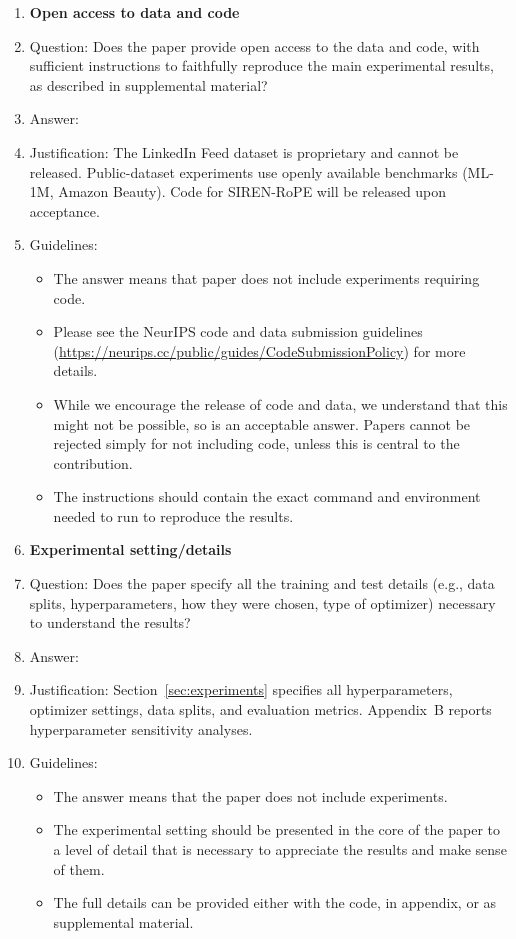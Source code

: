 \begin{enumerate}
\item {\bf Open access to data and code}
    \item[] Question: Does the paper provide open access to the data and code, with sufficient instructions to faithfully reproduce the main experimental results, as described in supplemental material?
    \item[] Answer: \answerNo{}
    \item[] Justification: The LinkedIn Feed dataset is proprietary and cannot be released. Public-dataset experiments use openly available benchmarks (ML-1M, Amazon Beauty). Code for SIREN-RoPE will be released upon acceptance.
    \item[] Guidelines:
    \begin{itemize}
        \item The answer \answerNA{} means that paper does not include experiments requiring code.
        \item Please see the NeurIPS code and data submission guidelines (\url{https://neurips.cc/public/guides/CodeSubmissionPolicy}) for more details.
        \item While we encourage the release of code and data, we understand that this might not be possible, so \answerNo{} is an acceptable answer. Papers cannot be rejected simply for not including code, unless this is central to the contribution.
        \item The instructions should contain the exact command and environment needed to run to reproduce the results.
    \end{itemize}

\item {\bf Experimental setting/details}
    \item[] Question: Does the paper specify all the training and test details (e.g., data splits, hyperparameters, how they were chosen, type of optimizer) necessary to understand the results?
    \item[] Answer: \answerYes{}
    \item[] Justification: Section~\ref{sec:experiments} specifies all hyperparameters, optimizer settings, data splits, and evaluation metrics. Appendix~B reports hyperparameter sensitivity analyses.
    \item[] Guidelines:
    \begin{itemize}
        \item The answer \answerNA{} means that the paper does not include experiments.
        \item The experimental setting should be presented in the core of the paper to a level of detail that is necessary to appreciate the results and make sense of them.
        \item The full details can be provided either with the code, in appendix, or as supplemental material.
    \end{itemize}


\end{enumerate}
